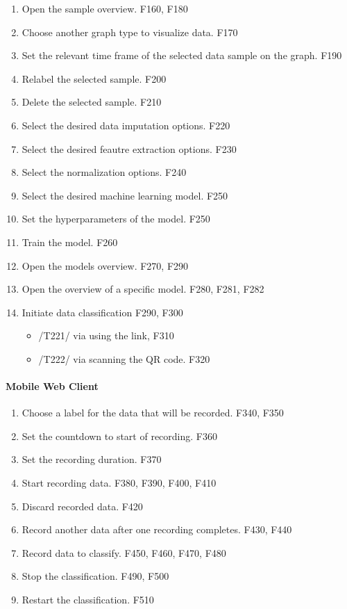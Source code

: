 \begin{enumerate}[{label = \textbf{/T{\protect\twodigits{\arabic{enumi}}}0/}, leftmargin = *}]
\begin{itemize}
    \end{itemize}
    \item Open the sample overview. F160, F180
    \item Choose another graph type to visualize data. F170
    \item Set the relevant time frame of the selected data sample on the graph. F190
    \item Relabel the selected sample. F200
    \item Delete the selected sample. F210
    \item Select the desired data imputation options. F220
    \item Select the desired feautre extraction options. F230
    \item Select the normalization options. F240
    \item Select the desired machine learning model. F250
    \item Set the hyperparameters of the model. F250
    \item Train the model. F260
    \item Open the models overview. F270, F290
    \item Open the overview of a specific model. F280, F281, F282
    \item Initiate data classification F290, F300
    \begin{itemize}
        \item /T221/ via using the link, F310
        \item /T222/ via scanning the QR code. F320
    \end{itemize} 
\end{enumerate}

\paragraph{Mobile Web Client}
\begin{enumerate}[resume*]
    \item Choose a label for the data that will be recorded. F340, F350
    \item Set the countdown to start of recording. F360
    \item Set the recording duration. F370
    \item Start recording data. F380, F390, F400, F410
    \item Discard recorded data. F420
    \item Record another data after one recording completes. F430, F440
    \item Record data to classify. F450, F460, F470, F480
    \item Stop the classification. F490, F500
    \item Restart the classification. F510
\end{enumerate}

